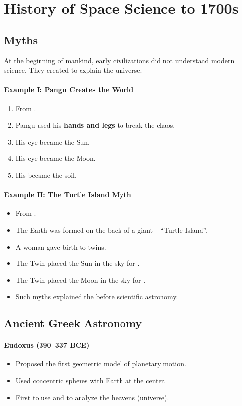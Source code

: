 \documentclass[12pt]{article}
\newcommand{\fillin}[1]{\uline{\hspace{#1}}}
\begin{document}
\section*{History of Space Science to 1700s}

\subsection*{Myths}
At the beginning of mankind, early civilizations did not understand modern science. 
They created \fillin{6cm} to explain the universe.

\paragraph{Example I: Pangu Creates the World}
\begin{enumerate}
  \item From \fillin{6cm}.
  \item Pangu used his \textbf{hands and legs} to break the chaos.
  \item His \fillin{2cm} eye became the Sun.
  \item His \fillin{2cm} eye became the Moon.
  \item His \fillin{2cm} became the soil.
\end{enumerate}

\paragraph{Example II: The Turtle Island Myth}
\begin{itemize}
  \item From \fillin{8cm}.
  \item The Earth was formed on the back of a giant \fillin{2.5cm} -- ``Turtle Island''.
  \item A woman gave birth to twins.
  \item The \fillin{3cm} Twin placed the Sun in the sky for \fillin{5cm}.
  \item The \fillin{3cm} Twin placed the Moon in the sky for \fillin{5cm}.
  \item Such myths explained the \fillin{4cm} before scientific astronomy.
\end{itemize}

\subsection*{Ancient Greek Astronomy}
\paragraph{Eudoxus (390–337 BCE)}
\begin{itemize}
  \item Proposed the first geometric model of planetary motion.
  \item Used \fillin{2cm} concentric spheres with Earth at the center.
  \item First to use \fillin{3cm} and \fillin{3cm} to analyze the heavens (universe).
\end{itemize}
\end{document}
